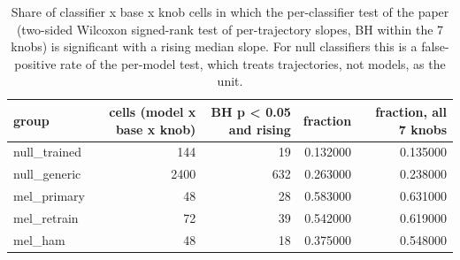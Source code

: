 \begin{table}
\caption{Share of classifier x base x knob cells in which the per-classifier test of the paper (two-sided Wilcoxon signed-rank test of per-trajectory slopes, BH within the 7 knobs) is significant with a rising median slope. For null classifiers this is a false-positive rate of the per-model test, which treats trajectories, not models, as the unit.}
\label{tab:T4_test_false_positive_rate}
\begin{tabular}{lrrrr}
\toprule
group & cells (model x base x knob) & BH p < 0.05 and rising & fraction & fraction, all 7 knobs \\
\midrule
null\_trained & 144 & 19 & 0.132000 & 0.135000 \\
null\_generic & 2400 & 632 & 0.263000 & 0.238000 \\
mel\_primary & 48 & 28 & 0.583000 & 0.631000 \\
mel\_retrain & 72 & 39 & 0.542000 & 0.619000 \\
mel\_ham & 48 & 18 & 0.375000 & 0.548000 \\
\bottomrule
\end{tabular}
\end{table}
